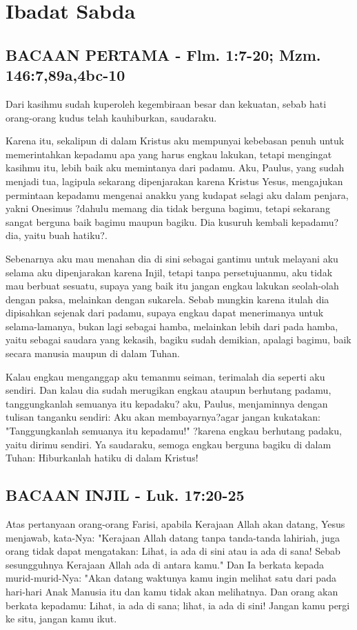 \documentclass[a5paper,headsepline,titlepage,11pt,nnormalheadings,DIVcalc]{scrbook}
\begin{document}
\section*{Ibadat Sabda}

\subsection*{BACAAN PERTAMA - Flm. 1:7-20; Mzm. 146:7,89a,4bc-10}

Dari kasihmu sudah kuperoleh kegembiraan besar dan kekuatan, sebab hati orang-orang kudus telah kauhiburkan, saudaraku.

Karena itu, sekalipun di dalam Kristus aku mempunyai kebebasan penuh untuk memerintahkan kepadamu apa yang harus engkau lakukan,
tetapi mengingat kasihmu itu, lebih baik aku memintanya dari padamu. Aku, Paulus, yang sudah menjadi tua, lagipula sekarang dipenjarakan karena Kristus Yesus,
mengajukan permintaan kepadamu mengenai anakku yang kudapat selagi aku dalam penjara, yakni Onesimus
?dahulu memang dia tidak berguna bagimu, tetapi sekarang sangat berguna baik bagimu maupun bagiku.
Dia kusuruh kembali kepadamu?dia, yaitu buah hatiku?.

Sebenarnya aku mau menahan dia di sini sebagai gantimu untuk melayani aku selama aku dipenjarakan karena Injil,
tetapi tanpa persetujuanmu, aku tidak mau berbuat sesuatu, supaya yang baik itu jangan engkau lakukan seolah-olah dengan paksa, melainkan dengan sukarela.
Sebab mungkin karena itulah dia dipisahkan sejenak dari padamu, supaya engkau dapat menerimanya untuk selama-lamanya,
bukan lagi sebagai hamba, melainkan lebih dari pada hamba, yaitu sebagai saudara yang kekasih, bagiku sudah demikian, apalagi bagimu, baik secara manusia maupun di dalam Tuhan.

Kalau engkau menganggap aku temanmu seiman, terimalah dia seperti aku sendiri.
Dan kalau dia sudah merugikan engkau ataupun berhutang padamu, tanggungkanlah semuanya itu kepadaku?
aku, Paulus, menjaminnya dengan tulisan tanganku sendiri: Aku akan membayarnya?agar jangan kukatakan: "Tanggungkanlah semuanya itu kepadamu!" ?karena engkau berhutang padaku, yaitu dirimu sendiri.
Ya saudaraku, semoga engkau berguna bagiku di dalam Tuhan: Hiburkanlah hatiku di dalam Kristus!

\subsection*{BACAAN INJIL - Luk. 17:20-25}

Atas pertanyaan orang-orang Farisi, apabila Kerajaan Allah akan datang, Yesus menjawab, kata-Nya: "Kerajaan Allah datang tanpa tanda-tanda lahiriah,
juga orang tidak dapat mengatakan: Lihat, ia ada di sini atau ia ada di sana! Sebab sesungguhnya Kerajaan Allah ada di antara kamu."
Dan Ia berkata kepada murid-murid-Nya: "Akan datang waktunya kamu ingin melihat satu dari pada hari-hari Anak Manusia itu dan kamu tidak akan melihatnya.
Dan orang akan berkata kepadamu: Lihat, ia ada di sana; lihat, ia ada di sini! Jangan kamu pergi ke situ, jangan kamu ikut.
\end{document}
